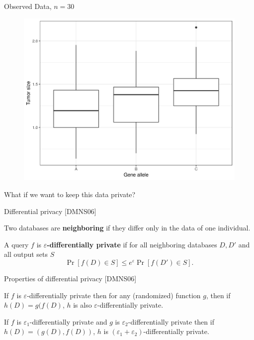 \documentclass{beamer}
\begin{document}
\begin{frame}{Observed Data, $n=30$}
\begin{figure}
  \includegraphics[scale=0.5]{simulation/observed-plot}
\end{figure}
What if we want to keep this data private?
\end{frame}

\begin{frame}{Differential privacy [DMNS06]}

\begin{definition}
Two databases are \textbf{neighboring} if they differ only in the data of one individual.
\end{definition}
\pause
\begin{definition}
A query $f$ is \textbf{$\varepsilon$-differentially private} if for all neighboring databases $D, D'$ and all output sets $S$
\begin{equation*}
\Pr[f(D) \in S] \leq e^\varepsilon \Pr[f(D') \in S].
\end{equation*}
\end{definition}
\end{frame}

\begin{frame}{Properties of differential privacy [DMNS06]}
\begin{theorem}
If $f$ is $\varepsilon$-differentially private then for any (randomized) function $g$, then if $h(D) = g(f(D)$, $h$ is also $\varepsilon$-differentially private.
\end{theorem}
\pause
\begin{theorem}[Composition]
If $f$ is $\varepsilon_1$-differentially private and $g$ is $\varepsilon_2$-differentially private then if $h(D) = (g(D), f(D))$, $h$ is  $(\varepsilon_1+\varepsilon_2)$-differentially private.
\end{theorem}
\end{frame}
\end{document}
